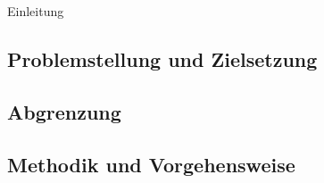 \newpage
{Einleitung}
\subsection{Problemstellung und Zielsetzung}
\subsection{Abgrenzung}
\subsection{Methodik und Vorgehensweise}
